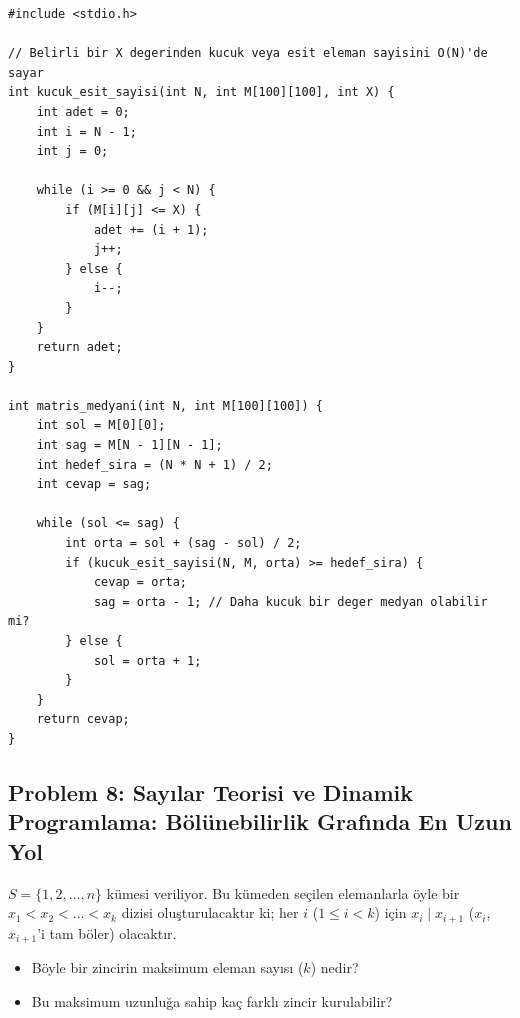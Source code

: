 \begin{lstlisting}[language=CTemel]
#include <stdio.h>

// Belirli bir X degerinden kucuk veya esit eleman sayisini O(N)'de sayar
int kucuk_esit_sayisi(int N, int M[100][100], int X) {
    int adet = 0;
    int i = N - 1;
    int j = 0;
    
    while (i >= 0 && j < N) {
        if (M[i][j] <= X) {
            adet += (i + 1);
            j++;
        } else {
            i--;
        }
    }
    return adet;
}

int matris_medyani(int N, int M[100][100]) {
    int sol = M[0][0];
    int sag = M[N - 1][N - 1];
    int hedef_sira = (N * N + 1) / 2;
    int cevap = sag;
    
    while (sol <= sag) {
        int orta = sol + (sag - sol) / 2;
        if (kucuk_esit_sayisi(N, M, orta) >= hedef_sira) {
            cevap = orta;
            sag = orta - 1; // Daha kucuk bir deger medyan olabilir mi?
        } else {
            sol = orta + 1;
        }
    }
    return cevap;
}
\end{lstlisting}

\subsection{Problem 8: Sayılar Teorisi ve Dinamik Programlama: Bölünebilirlik Grafında En Uzun Yol}

\begin{example}
$S = \{1, 2, \dots, n\}$ kümesi veriliyor. Bu kümeden seçilen elemanlarla öyle bir $x_1 < x_2 < \dots < x_k$ dizisi oluşturulacaktır ki; her $i$ ($1 \le i < k$) için $x_i \mid x_{i+1}$ ($x_i$, $x_{i+1}$'i tam böler) olacaktır.
\begin{itemize}
    \item[(a)] Böyle bir zincirin maksimum eleman sayısı ($k$) nedir?
    \item[(b)] Bu maksimum uzunluğa sahip kaç farklı zincir kurulabilir?
\end{itemize}
\end{example}

